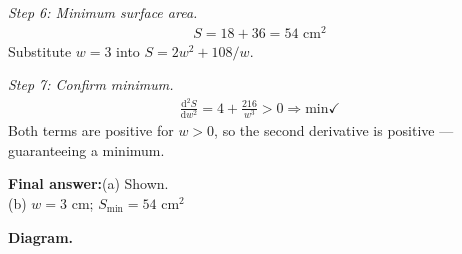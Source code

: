 \documentclass[11pt]{article}
\begin{document}
\textit{Step 6: Minimum surface area.}
\[\begin{gathered}
S = 18 + 36 = 54 \text{ cm}^2
\end{gathered}\]
Substitute \( w = 3 \) into \( S = 2w^2 + 108/w \).

\textit{Step 7: Confirm minimum.}
\[\begin{gathered}
\frac{\mathrm{d}^2S}{\mathrm{d}w^2} = 4 + \frac{216}{w^3} > 0 \Rightarrow \text{min} \checkmark
\end{gathered}\]
Both terms are positive for \( w > 0 \), so the second derivative is positive --- guaranteeing a minimum.

\begin{answerbox}
\textbf{Final answer:}\quad (a) Shown. \\[3pt]  (b) \(\displaystyle  w = 3 \) cm; \(\displaystyle  S_{\min} = 54 \text{ cm}^2 \)
\end{answerbox}
\textbf{Diagram.}
\end{document}

